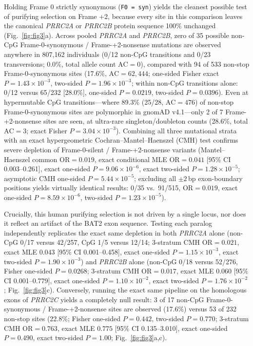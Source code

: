 \documentclass[10pt,letterpaper]{article}
\newcommand{\gene}[1]{\textit{#1}}
\begin{document}
Holding Frame 0 strictly synonymous (\texttt{F0 = syn}) yields the cleanest possible test of purifying selection on Frame +2, because every site in this comparison leaves the canonical \gene{PRRC2A} or \gene{PRRC2B} protein sequence 100\% unchanged (Fig.~\ref{fig:fig3}a). Across pooled \gene{PRRC2A} and \gene{PRRC2B}, zero of 35 possible non-CpG Frame-0-synonymous / Frame-+2-nonsense mutations are observed anywhere in 807,162 individuals (0/12 non-CpG transitions and 0/23 transversions; 0.0\%, total allele count $\text{AC} = 0$), compared with 94 of 533 non-stop Frame-0-synonymous sites (17.6\%, $\text{AC} = 62,444$; one-sided Fisher exact $P = 1.43 \times 10^{-3}$, two-sided $P = 1.96 \times 10^{-3}$; within non-CpG transitions alone: 0/12 versus 65/232 [28.0\%], one-sided $P = 0.0219$, two-sided $P = 0.0396$). Even at hypermutable CpG transitions---where 89.3\% (25/28, $\text{AC} = 476$) of non-stop Frame-0-synonymous sites are polymorphic in gnomAD v4.1---only 2 of 7 Frame-+2-nonsense sites are seen, at ultra-rare singleton/doubleton counts (28.6\%, total $\text{AC} = 3$; exact Fisher $P = 3.04 \times 10^{-3}$). Combining all three mutational strata with an exact hypergeometric Cochran--Mantel--Haenszel (CMH) test confirms severe depletion of Frame-0-silent / Frame-+2-nonsense variants (Mantel--Haenszel common $\text{OR} = 0.019$, exact conditional MLE $\text{OR} = 0.041$ [95\% CI 0.003--0.261], exact one-sided $P = 9.06 \times 10^{-6}$, exact two-sided $P = 1.28 \times 10^{-5}$; asymptotic CMH one-sided $P = 5.44 \times 10^{-5}$; excluding all $\pm 2$\,bp exon-boundary positions yields virtually identical results: 0/35 vs.\ 91/515, $\text{OR} = 0.019$, exact one-sided $P = 8.59 \times 10^{-6}$, two-sided $P = 1.23 \times 10^{-5}$).

Crucially, this human purifying selection is not driven by a single locus, nor does it reflect an artifact of the BAT2 exon sequence. Testing each paralog independently replicates the exact same depletion in both \gene{PRRC2A} alone (non-CpG 0/17 versus 42/257, CpG 1/5 versus 12/14; 3-stratum CMH $\text{OR} = 0.021$, exact MLE $0.043$ [95\% CI 0.001--0.458], exact one-sided $P = 1.15 \times 10^{-3}$, exact two-sided $P = 1.90 \times 10^{-3}$) and \gene{PRRC2B} alone (non-CpG 0/18 versus 52/276, Fisher one-sided $P = 0.0268$; 3-stratum CMH $\text{OR} = 0.017$, exact MLE $0.060$ [95\% CI 0.001--0.779], exact one-sided $P = 1.10 \times 10^{-2}$, exact two-sided $P = 1.76 \times 10^{-2}$; Fig.~\ref{fig:fig3}c). Conversely, running the exact same pipeline on the homologous exons of \gene{PRRC2C} yields a completely null result: 3 of 17 non-CpG Frame-0-synonymous / Frame-+2-nonsense sites are observed (17.6\%) versus 53 of 232 non-stop sites (22.8\%; Fisher one-sided $P = 0.442$, two-sided $P = 0.770$; 3-stratum CMH $\text{OR} = 0.763$, exact MLE $0.775$ [95\% CI 0.135--3.010], exact one-sided $P = 0.490$, exact two-sided $P = 1.00$; Fig.~\ref{fig:fig3}a,c).
\end{document}
